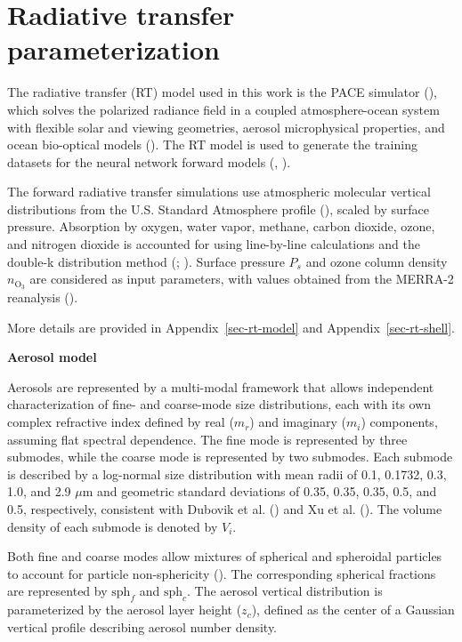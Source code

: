 \documentclass[
  11pt,
  letterpaper,
]{scrreprt}
\begin{document}
\section{Radiative transfer
parameterization}\label{radiative-transfer-parameterization}

The radiative transfer (RT) model used in this work is the PACE
simulator (), which solves
the polarized radiance field in a coupled atmosphere-ocean system with
flexible solar and viewing geometries, aerosol microphysical properties,
and ocean bio-optical models (). The RT model is used to generate the training datasets for the
neural network forward models (, ).

The forward radiative transfer simulations use atmospheric molecular
vertical distributions from the U.S. Standard Atmosphere profile
(), scaled by
surface pressure. Absorption by oxygen, water vapor, methane, carbon
dioxide, ozone, and nitrogen dioxide is accounted for using line-by-line
calculations and the double-k distribution method
(;
). Surface pressure \(P_s\)
and ozone column density \(n_{\mathrm{O}_3}\) are considered as input
parameters, with values obtained from the MERRA-2 reanalysis
().

More details are provided in Appendix~\ref{sec-rt-model} and
Appendix~\ref{sec-rt-shell}.

\textbf{Aerosol model}

Aerosols are represented by a multi-modal framework that allows
independent characterization of fine- and coarse-mode size
distributions, each with its own complex refractive index defined by
real (\(m_r\)) and imaginary (\(m_i\)) components, assuming flat
spectral dependence. The fine mode is represented by three submodes,
while the coarse mode is represented by two submodes. Each submode is
described by a log-normal size distribution with mean radii of 0.1,
0.1732, 0.3, 1.0, and 2.9 \(\mu\mathrm{m}\) and geometric standard
deviations of 0.35, 0.35, 0.35, 0.5, and 0.5, respectively, consistent
with Dubovik et al. () and Xu et al.
(). The volume density of each submode is
denoted by \(V_i\).

Both fine and coarse modes allow mixtures of spherical and spheroidal
particles to account for particle non-sphericity
(). The corresponding
spherical fractions are represented by \(\mathrm{sph}_f\) and
\(\mathrm{sph}_c\). The aerosol vertical distribution is parameterized
by the aerosol layer height (\(z_c\)), defined as the center of a
Gaussian vertical profile describing aerosol number density.
\end{document}
